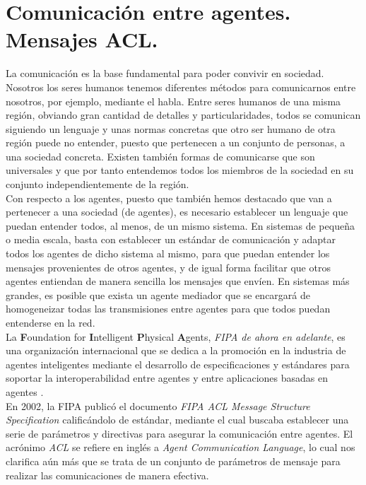 \section{Comunicación entre agentes. Mensajes ACL.}

La comunicación es la base fundamental para poder convivir en sociedad. Nosotros los seres humanos tenemos diferentes métodos para comunicarnos entre nosotros, por ejemplo, mediante el habla. Entre seres humanos de una misma región, obviando gran cantidad de detalles y particularidades, todos se comunican siguiendo un lenguaje y unas normas concretas que otro ser humano de otra región puede no entender, puesto que pertenecen a un conjunto de personas, a una sociedad concreta. Existen también formas de comunicarse que son universales y que por tanto entendemos todos los miembros de la sociedad en su conjunto independientemente de la región.\\

Con respecto a los agentes, puesto que también hemos destacado que van a pertenecer a una sociedad (de agentes), es necesario establecer un lenguaje que puedan entender todos, al menos, de un mismo sistema. En sistemas de pequeña o media escala, basta con establecer un estándar de comunicación y adaptar todos los agentes de dicho sistema al mismo, para que puedan entender los mensajes provenientes de otros agentes, y de igual forma facilitar que otros agentes entiendan de manera sencilla los mensajes que envíen. En sistemas más grandes, es posible que exista un agente mediador que se encargará de homogeneizar todas las transmisiones entre agentes para que todos puedan entenderse en la red.\\

La \textbf{F}oundation for \textbf{I}ntelligent \textbf{P}hysical \textbf{A}gents, \textit{FIPA de ahora en adelante}, es una organización internacional que se dedica a la promoción en la industria de agentes inteligentes mediante el desarrollo de especificaciones y estándares para soportar la interoperabilidad entre agentes y entre aplicaciones basadas en agentes \cite{FIPA}.\\

En 2002, la FIPA publicó el documento \textit{FIPA ACL Message Structure Specification}\cite{FIPA} calificándolo de estándar, mediante el cual buscaba establecer una serie de parámetros y directivas para asegurar la comunicación entre agentes. El acrónimo \textit{ACL} se refiere en inglés a \textit{Agent Communication Language}\cite{JADEMessage}, lo cual nos clarifica aún más que se trata de un conjunto de parámetros de mensaje para realizar las comunicaciones de manera efectiva.\\

